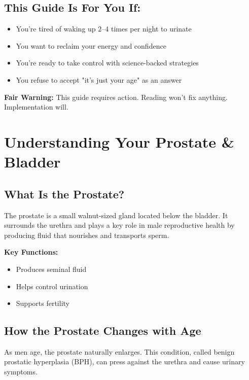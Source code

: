 \documentclass[11pt,oneside,openany]{book}
\begin{document}
\section*{This Guide Is For You If:}
\begin{itemize}[leftmargin=*]
\item You're tired of waking up 2--4 times per night to urinate
\item You want to reclaim your energy and confidence
\item You're ready to take control with science-backed strategies
\item You refuse to accept "it's just your age" as an answer
\end{itemize}

\textbf{Fair Warning:} This guide requires action. Reading won't fix anything. Implementation will.

\clearpage
\tableofcontents

\clearpage

\chapter*{Understanding Your Prostate \& Bladder}

\section*{What Is the Prostate?}

The prostate is a small walnut-sized gland located below the bladder. It surrounds the urethra and plays a key role in male reproductive health by producing fluid that nourishes and transports sperm.

\textbf{Key Functions:}
\begin{itemize}[leftmargin=*]
\item Produces seminal fluid
\item Helps control urination
\item Supports fertility
\end{itemize}

\section*{How the Prostate Changes with Age}

As men age, the prostate naturally enlarges. This condition, called benign prostatic hyperplasia (BPH), can press against the urethra and cause urinary symptoms.
\end{document}
